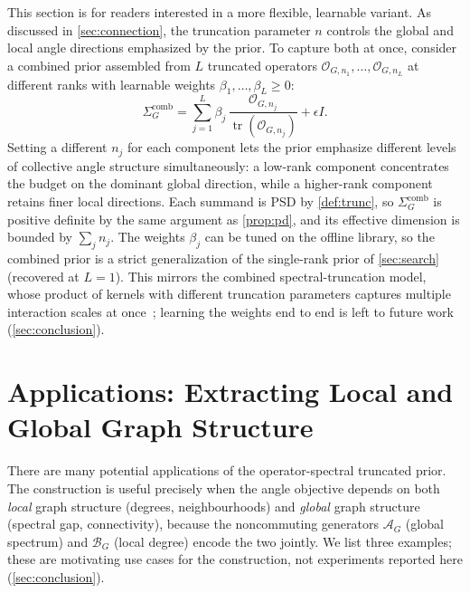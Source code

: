 \documentclass[aps,prxquantum,reprint,amsmath,amssymb,floatfix,nofootinbib,superscriptaddress,longbibliography]{revtex4-2}
\theoremstyle{remark}
\newcommand{\calO}{\mathcal{O}}
\newcommand{\calA}{\mathcal{A}}
\newcommand{\calB}{\mathcal{B}}
\begin{document}
This section is for readers interested in a more flexible, learnable variant.  As
discussed in \cref{sec:connection}, the truncation parameter \(n\) controls the
global and local angle directions emphasized by the prior.  To capture both at
once, consider a combined prior assembled from \(L\) truncated operators
\(\calO_{G,n_1},\ldots,\calO_{G,n_L}\) at different ranks with learnable weights
\(\beta_1,\ldots,\beta_L\ge0\):
\begin{equation}
    \Sigma_G^{\mathrm{comb}}
    =\sum_{j=1}^{L}\beta_j\,\frac{\calO_{G,n_j}}{\operatorname{tr}(\calO_{G,n_j})}
    +\epsilon I .
    \label{eq:combined}
\end{equation}
Setting a different \(n_j\) for each component lets the prior emphasize different
levels of collective angle structure simultaneously: a low-rank component
concentrates the budget on the dominant global direction, while a higher-rank
component retains finer local directions.  Each summand is PSD by
\cref{def:trunc}, so \(\Sigma_G^{\mathrm{comb}}\) is positive definite by the same
argument as \cref{prop:pd}, and its effective dimension is bounded by
\(\sum_j n_j\).  The weights \(\beta_j\) can be tuned on the offline library, so
the combined prior is a strict generalization of the single-rank prior of
\cref{sec:search} (recovered at \(L{=}1\)).  This mirrors the combined
spectral-truncation model, whose product of kernels with different truncation
parameters captures multiple interaction scales at once~\cite{hashimoto2024spectral};
learning the weights end to end is left to future work (\cref{sec:conclusion}).

\section{Applications: Extracting Local and Global Graph Structure}
\label{sec:applications}

There are many potential applications of the operator-spectral truncated prior.
The construction is useful precisely when the angle objective depends on both
\emph{local} graph structure (degrees, neighbourhoods) and \emph{global} graph
structure (spectral gap, connectivity), because the noncommuting generators
\(\calA_G\) (global spectrum) and \(\calB_G\) (local degree) encode the two
jointly.  We list three examples; these are motivating use cases for the
construction, not experiments reported here (\cref{sec:conclusion}).
\end{document}

